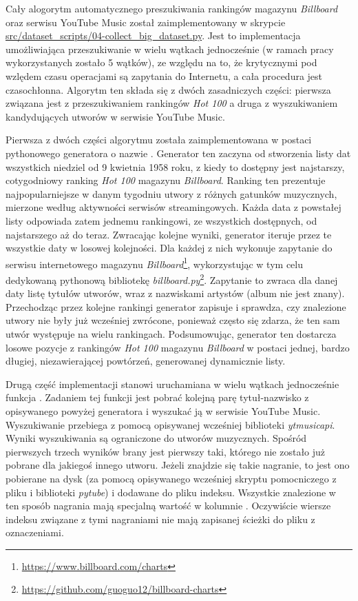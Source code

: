 Cały alogorytm automatycznego preszukiwania rankingów magazynu \emph{Billboard} oraz serwisu YouTube
Music został zaimplementowany w skrypcie \url{src/dataset_scripts/04-collect_big_dataset.py}. Jest
to implementacja umożliwiająca przeszukiwanie w wielu wątkach jednocześnie (w ramach pracy
wykorzystanych zostało 5 wątków), ze względu na to, że krytycznymi pod wzlędem czasu operacjami są
zapytania do Internetu, a cała procedura jest czasochłonna. Algorytm ten składa się z dwóch
zasadniczych części: pierwsza związana jest z przeszukiwaniem rankingów \emph{Hot 100} a druga z
wyszukiwaniem kandydujących utworów w serwisie YouTube Music.

Pierwsza z dwóch części algorytmu została zaimplementowana w postaci pythonowego generatora o nazwie
. Generator ten zaczyna od stworzenia listy dat wszystkich
niedziel od 9 kwietnia 1958 roku, z kiedy to dostępny jest najstarszy, cotygodniowy ranking
\emph{Hot 100} magazynu \emph{Billboard}. Ranking ten prezentuje najpopularniejsze w danym tygodniu
utwory z różnych gatunków muzycznych, mierzone według aktywności serwisów streamingowych. Każda data
z powstałej listy odpowiada zatem jednemu rankingowi, ze wszystkich dostępnych, od najstarszego aż
do teraz. Zwracając kolejne wyniki, generator iteruje przez te wszystkie daty w losowej kolejności.
Dla każdej z nich wykonuje zapytanie do serwisu internetowego magazynu
\emph{Billboard}\footnote{\url{https://www.billboard.com/charts}}, wykorzystując w tym celu dedykowaną
pythonową bibliotekę \emph{billboard.py}\footnote{\url{https://github.com/guoguo12/billboard-charts}}.
Zapytanie to zwraca dla danej daty listę tytułów utworów, wraz z nazwiskami artystów (album nie jest
znany). Przechodząc przez kolejne rankingi generator zapisuje i sprawdza, czy znalezione utwory nie
były już wcześniej zwrócone, ponieważ często się zdarza, że ten sam utwór występuje na wielu
rankingach. Podsumowując, generator ten dostarcza losowe pozycje z rankingów \emph{Hot 100} magazynu
\emph{Billboard} w postaci jednej, bardzo długiej, niezawierającej powtórzeń, generowanej
dynamicznie listy.

Drugą część implementacji stanowi uruchamiana w wielu wątkach jednocześnie funkcja
. Zadaniem tej funkcji jest pobrać kolejną parę tytuł-nazwisko z
opisywanego powyżej generatora i wyszukać ją w serwisie YouTube Music. Wyszukiwanie przebiega z
pomocą opisywanej wcześniej biblioteki \emph{ytmusicapi}. Wyniki wyszukiwania są ograniczone do
utworów muzycznych. Spośród pierwszych trzech wyników brany jest pierwszy taki, którego
 nie zostało już pobrane dla jakiegoś innego utworu. Jeżeli znajdzie się takie
nagranie, to jest ono pobierane na dysk (za pomocą opisywanego wcześniej skryptu pomocniczego z
pliku i biblioteki \emph{pytube}) i dodawane do pliku indeksu. Wszystkie znalezione w ten sposób
nagrania mają specjalną wartość  w kolumnie . Oczywiście wiersze
indeksu związane z tymi nagraniami nie mają zapisanej ścieżki do pliku z oznaczeniami.

